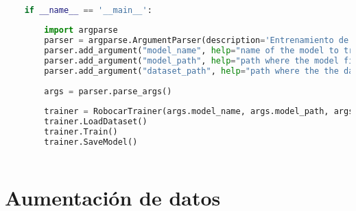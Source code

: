 \begin{lstlisting}[title={msg\_sync.py},language=Python]
        
        
        
    if __name__ == '__main__':
            
        import argparse
        parser = argparse.ArgumentParser(description='Entrenamiento de una red neuronal convolucional')
        parser.add_argument("model_name", help="name of the model to train")
        parser.add_argument("model_path", help="path where the model files will be saved")
        parser.add_argument("dataset_path", help="path where the the dataset is saved")
            
        args = parser.parse_args()
            
        trainer = RobocarTrainer(args.model_name, args.model_path, args.dataset_path)
        trainer.LoadDataset()
        trainer.Train()
        trainer.SaveModel()
    
    \end{lstlisting}

\section{Aumentación de datos}

